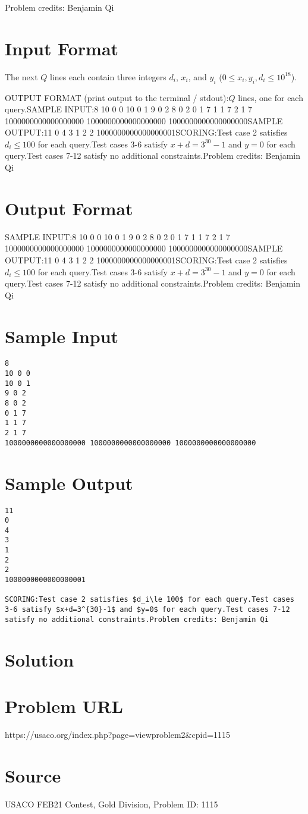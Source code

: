 \documentclass[12pt]{article}
\begin{document}
Problem credits: Benjamin Qi



\section*{Input Format}
The next $Q$ lines each contain three integers $d_i$, $x_i$, and $y_i$
($0\le x_i,y_i,d_i\le 10^{18}$).

OUTPUT FORMAT (print output to the terminal / stdout):$Q$ lines, one for each query.SAMPLE INPUT:8
10 0 0
10 0 1
9 0 2
8 0 2
0 1 7
1 1 7
2 1 7
1000000000000000000 1000000000000000000 1000000000000000000SAMPLE OUTPUT:11
0
4
3
1
2
2
1000000000000000001SCORING:Test case 2 satisfies $d_i\le 100$ for each query.Test cases 3-6 satisfy $x+d=3^{30}-1$ and $y=0$ for each query.Test cases 7-12 satisfy no additional constraints.Problem credits: Benjamin Qi

\section*{Output Format}
SAMPLE INPUT:8
10 0 0
10 0 1
9 0 2
8 0 2
0 1 7
1 1 7
2 1 7
1000000000000000000 1000000000000000000 1000000000000000000SAMPLE OUTPUT:11
0
4
3
1
2
2
1000000000000000001SCORING:Test case 2 satisfies $d_i\le 100$ for each query.Test cases 3-6 satisfy $x+d=3^{30}-1$ and $y=0$ for each query.Test cases 7-12 satisfy no additional constraints.Problem credits: Benjamin Qi

\section*{Sample Input}
\begin{verbatim}
8
10 0 0
10 0 1
9 0 2
8 0 2
0 1 7
1 1 7
2 1 7
1000000000000000000 1000000000000000000 1000000000000000000
\end{verbatim}

\section*{Sample Output}
\begin{verbatim}
11
0
4
3
1
2
2
1000000000000000001

SCORING:Test case 2 satisfies $d_i\le 100$ for each query.Test cases 3-6 satisfy $x+d=3^{30}-1$ and $y=0$ for each query.Test cases 7-12 satisfy no additional constraints.Problem credits: Benjamin Qi
\end{verbatim}

\section*{Solution}


\section*{Problem URL}
https://usaco.org/index.php?page=viewproblem2&cpid=1115

\section*{Source}
USACO FEB21 Contest, Gold Division, Problem ID: 1115
\end{document}
